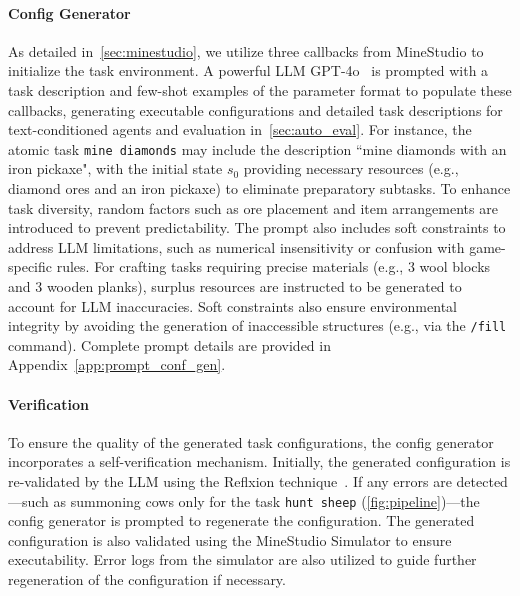 \paragraph{Config Generator}
As detailed in~\cref{sec:minestudio}, we utilize three callbacks from MineStudio to initialize the task environment. A powerful LLM GPT-4o~\citep{gpt4} is prompted with a task description and few-shot examples of the parameter format to populate these callbacks, generating executable configurations and detailed task descriptions for text-conditioned agents and evaluation in~\cref{sec:auto_eval}. For instance, the atomic task \texttt{mine diamonds} may include the description ``mine diamonds with an iron pickaxe", with the initial state $s_0$ providing necessary resources (e.g., diamond ores and an iron pickaxe) to eliminate preparatory subtasks. To enhance task diversity, random factors such as ore placement and item arrangements are introduced to prevent predictability. The prompt also includes soft constraints to address LLM limitations, such as numerical insensitivity or confusion with game-specific rules. For crafting tasks requiring precise materials (e.g., 3 wool blocks and 3 wooden planks), surplus resources are instructed to be generated to account for LLM inaccuracies. Soft constraints also ensure environmental integrity by avoiding the generation of inaccessible structures (e.g., via the \texttt{/fill} command). Complete prompt details are provided in Appendix~\ref{app:prompt_conf_gen}.

\paragraph{Verification}

To ensure the quality of the generated task configurations, the config generator incorporates a self-verification mechanism. Initially, the generated configuration is re-validated by the LLM using the Reflxion technique~\citep{reflexion}. If any errors are detected—such as summoning cows only for the task \texttt{hunt sheep} (\cref{fig:pipeline})—the config generator is prompted to regenerate the configuration. The generated configuration is also validated using the MineStudio Simulator to ensure executability. Error logs from the simulator are also utilized to guide further regeneration of the configuration if necessary.

